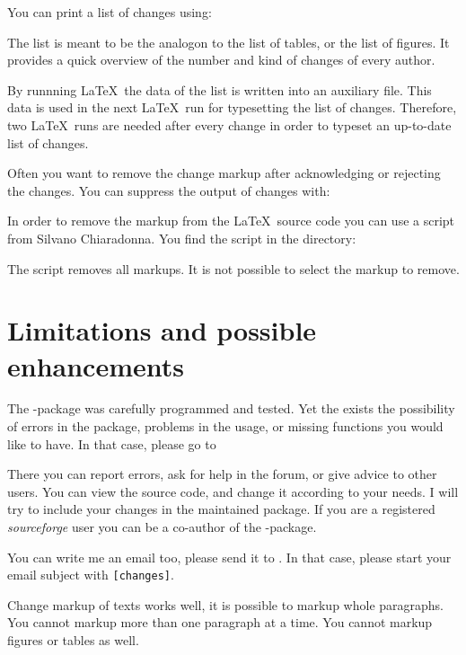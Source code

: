 
You can print a list of changes using:


The list is meant to be the analogon to the list of tables, or the list of figures.
It provides a quick overview of the number and kind of changes of every author.

By runnning \LaTeX\ the data of the list is written into an auxiliary file.
This data is used in the next \LaTeX\ run for typesetting the list of changes.
Therefore, two \LaTeX\ runs are needed after every change in order to typeset an up-to-date list of changes.



Often you want to remove the change markup after acknowledging or rejecting the changes.
You can suppress the output of changes with:



In order to remove the markup from the \LaTeX\ source code  you can use a script from Silvano Chiaradonna.
You find the script in the directory:



The script removes all markups.
It is not possible to select the markup to remove.

\section{Limitations and possible enhancements}
\label{sec:limitations}

The -package was carefully programmed and tested.
Yet the exists the possibility of errors in the package, problems in the usage, or missing functions you would like to have.
In that case, please go to



There you can report errors, ask for help in the forum, or give advice to other users.
You can view the source code, and change it according to your needs.
I will try to include your changes in the maintained package.
If you are a registered \emph{sourceforge} user you can be a co-author of the -package.

You can write me an email too, please send it to .
In that case, please start your email subject with \texttt{[changes]}.

Change markup of texts works well, it is possible to markup whole paragraphs.
You cannot markup more than one paragraph at a time.
You cannot markup figures or tables as well.

